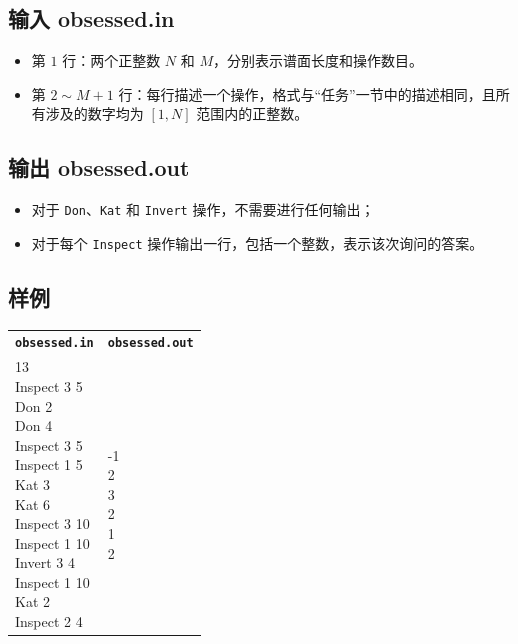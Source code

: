 \documentclass[UTF8, 11pt, a4paper]{article}
\begin{document}
\subsection*{输入 \makebox[0.5em]{} \small{obsessed.in}}
\begin{itemize}
    \item 第 $1$ 行：两个正整数 $N$ 和 $M$，分别表示谱面长度和操作数目。
    \item 第 $2 \sim M + 1$ 行：每行描述一个操作，格式与“任务”一节中的描述相同，且所有涉及的数字均为 $[1, N]$ 范围内的正整数。
\end{itemize}

\subsection*{输出 \makebox[0.5em]{} \small{obsessed.out}}
\begin{itemize}
    \item 对于 \texttt{Don}、\texttt{Kat} 和 \texttt{Invert} 操作，不需要进行任何输出；
    \item 对于每个 \texttt{Inspect} 操作输出一行，包括一个整数，表示该次询问的答案。
\end{itemize}

\subsection*{样例}
\begin{table}[h]\centering
\begin{tabularx}{0.8 \textwidth}{|X|X|}
\hline
\texttt{\textbf{obsessed.in}} & \texttt{\textbf{obsessed.out}} \\ \hline
{\ttfamily
10 13\newline
Inspect 3 5\newline
Don 2\newline
Don 4\newline
Inspect 3 5\newline
Inspect 1 5\newline
Kat 3\newline
Kat 6\newline
Inspect 3 10\newline
Inspect 1 10\newline
Invert 3 4\newline
Inspect 1 10\newline
Kat 2\newline
Inspect 2 4
} & {\ttfamily
-1\newline
-1\newline
2\newline
3\newline
2\newline
1\newline
2
}
\\ \hline
\end{tabularx}\end{table}
\end{document}
